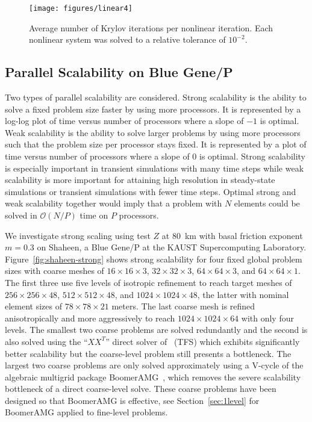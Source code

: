 \documentclass[draft,lineno,jgrga]{AGUTeX}
\newcommand{\bigO}{{\mathcal{O}}}
\begin{document}
\begin{article}
\begin{figure}
  \texttt{[image: figures/linear4]}
  \centering\caption{Average number of Krylov iterations per nonlinear iteration.  Each nonlinear system was solved to a relative tolerance of $10^{-2}$.}\label{fig:linear}
\end{figure}

\subsection{Parallel Scalability on Blue Gene/P}\label{sec:pscaling}
Two types of parallel scalability are considered.
Strong scalability is the ability to solve a fixed problem size faster by using more processors.
It is represented by a log-log plot of time versus number of processors where a slope of $-1$ is optimal.
Weak scalability is the ability to solve larger problems by using more processors such that the problem size per processor stays fixed.
It is represented by a plot of time versus number of processors where a slope of $0$ is optimal.
Strong scalability is especially important in transient simulations with many time steps while weak scalability is more important for attaining high resolution in steady-state simulations or transient simulations with fewer time steps.
Optimal strong and weak scalability together would imply that a problem with $N$ elements could be solved in $\bigO(N/P)$ time on $P$ processors.

We investigate strong scaling using test $Z$ at \SI{80}{\kilo\metre} with basal friction exponent $m= 0.3$ on Shaheen, a Blue Gene/P at the KAUST Supercomputing Laboratory.
Figure~\ref{fig:shaheen-strong} shows strong scalability for four fixed global problem sizes with coarse meshes of $16\times 16\times 3$, $32\times 32\times 3$, $64\times 64\times 3$, and $64\times 64\times 1$.
The first three use five levels of isotropic refinement to reach target meshes of $256\times 256\times 48$, $512\times 512\times 48$, and $1024\times 1024\times 48$, the latter with nominal element sizes of $78\times 78\times 21$ meters.
The last coarse mesh is refined anisotropically and more aggressively to reach $1024\times 1024\times 64$ with only four levels.
The smallest two coarse problems are solved redundantly and the second is also solved using the ``$XX^T$'' direct solver of~\cite{tufo2001fast} (TFS) which exhibits significantly better scalability but the coarse-level problem still presents a bottleneck.
The largest two coarse problems are only solved approximately using a V-cycle of the algebraic multigrid package BoomerAMG~\citep{henson2002bpa}, which removes the severe scalability bottleneck of a direct coarse-level solve.
These coarse problems have been designed so that BoomerAMG is effective, see Section~\ref{sec:1level} for BoomerAMG applied to fine-level problems.


\end{article}
\end{document}
